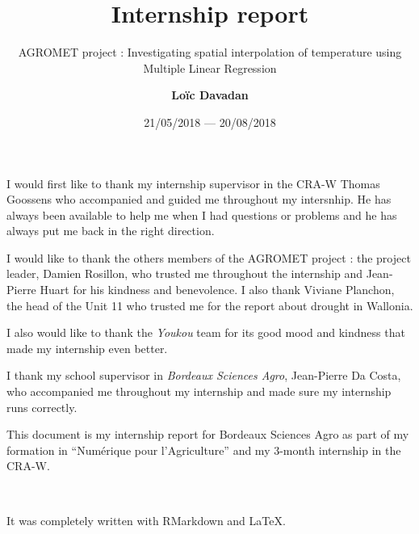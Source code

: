 \documentclass[12pt,twoside]{reedthesis}
\title{Internship report}
\author{\textbf{Loïc Davadan}}
\date{21/05/2018 --- 20/08/2018}
\subtitle{AGROMET project : Investigating spatial interpolation of temperature
using Multiple Linear Regression}
\theoremstyle{definition}
\theoremstyle{definition}
\theoremstyle{definition}
\theoremstyle{remark}
\begin{document}
  \maketitle

\frontmatter %
\pagestyle{empty} %
  \begin{acknowledgements}
    I would first like to thank my internship supervisor in the CRA-W Thomas
    Goossens who accompanied and guided me throughout my intersnhip. He has
    always been available to help me when I had questions or problems and he
    has always put me back in the right direction.
    
    I would like to thank the others members of the AGROMET project : the
    project leader, Damien Rosillon, who trusted me throughout the
    internship and Jean-Pierre Huart for his kindness and benevolence. I
    also thank Viviane Planchon, the head of the Unit 11 who trusted me for
    the report about drought in Wallonia.
    
    I also would like to thank the \emph{Youkou} team for its good mood and
    kindness that made my internship even better.
    
    I thank my school supervisor in \emph{Bordeaux Sciences Agro},
    Jean-Pierre Da Costa, who accompanied me throughout my internship and
    made sure my internship runs correctly.
  \end{acknowledgements}
  \begin{preface}
    This document is my internship report for Bordeaux Sciences Agro as part
    of my formation in ``Numérique pour l'Agriculture'' and my 3-month
    internship in the CRA-W.
    
    ~
    
    It was completely written with RMarkdown and \LaTeX.
  \end{preface}
\end{document}
